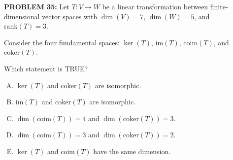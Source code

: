 \documentclass[12pt]{amsart}
\begin{document}
{%



\newpage


{\bf PROBLEM 35:}
% 
Let $T: V \to W$ be a linear transformation between finite-dimensional vector spaces with $\dim(V) = 7$, $\dim(W) = 5$, and $\text{rank}(T) = 3$. 

Consider the four fundamental spaces: $\ker(T)$, $\text{im}(T)$, $\text{coim}(T)$, and $\text{coker}(T)$.

Which statement is TRUE?

\begin{enumerate}[(A)]
\item $\ker(T)$ and $\text{coker}(T)$ are isomorphic.
\item $\text{im}(T)$ and $\text{coker}(T)$ are isomorphic.
\item $\dim(\text{coim}(T)) = 4$ and $\dim(\text{coker}(T)) = 3$.
\item $\dim(\text{coim}(T)) = 3$ and $\dim(\text{coker}(T)) = 2$.
\item $\ker(T)$ and $\text{coim}(T)$ have the same dimension.
\end{enumerate}


}
\end{document}
